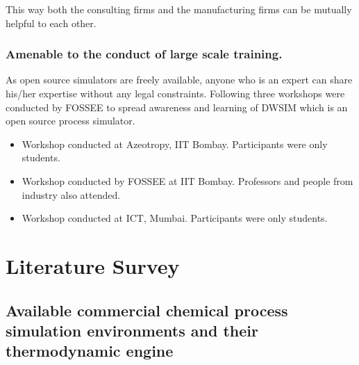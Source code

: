 \documentclass[12pt]{report}
\begin{document}
This way both the consulting firms and the manufacturing firms can be mutually helpful to each other.

\subsection{Amenable to the conduct of large scale training.}
As open source simulators are freely available, anyone who is an expert can share his/her expertise without any legal constraints. Following three workshops were conducted by FOSSEE to spread awareness and learning of DWSIM which is an open source process simulator.
\begin{itemize}
\item{Workshop conducted at Azeotropy, IIT Bombay. Participants were only students.}
\item{Workshop conducted by FOSSEE at IIT Bombay. Professors and people from industry also attended.}
\item{Workshop conducted at ICT, Mumbai. Participants were only students.}
\end{itemize}

\chapter{Literature Survey}
\section{Available commercial chemical process simulation environments and their thermodynamic engine}
\end{document}
